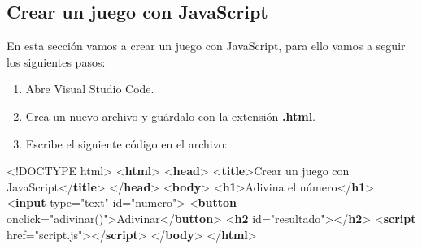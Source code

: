 \documentclass[
  a4paper,
  DIV=11,
  numbers=noendperiod,
  onepage,
  openany]{scrreprt}
\newenvironment{Shaded}{\begin{snugshade}}{\end{snugshade}}
\newcommand{\DataTypeTok}[1]{\textcolor[rgb]{0.68,0.00,0.00}{#1}}
\newcommand{\KeywordTok}[1]{\textcolor[rgb]{0.00,0.23,0.31}{\textbf{#1}}}
\newcommand{\NormalTok}[1]{\textcolor[rgb]{0.00,0.23,0.31}{#1}}
\newcommand{\OperatorTok}[1]{\textcolor[rgb]{0.37,0.37,0.37}{#1}}
\newcommand{\OtherTok}[1]{\textcolor[rgb]{0.00,0.23,0.31}{#1}}
\newcommand{\StringTok}[1]{\textcolor[rgb]{0.13,0.47,0.30}{#1}}
\begin{document}
\begin{tcolorbox}
\section{Crear un juego con
JavaScript}\label{crear-un-juego-con-javascript}

En esta sección vamos a crear un juego con JavaScript, para ello vamos a
seguir los siguientes pasos:

\begin{enumerate}
\def\labelenumi{\arabic{enumi}.}
\item
  Abre Visual Studio Code.
\item
  Crea un nuevo archivo y guárdalo con la extensión \textbf{.html}.
\item
  Escribe el siguiente código en el archivo:
\end{enumerate}

\begin{Shaded}
\begin{Highlighting}[]
\DataTypeTok{\textless{}!DOCTYPE}\NormalTok{ html}\DataTypeTok{\textgreater{}}
\DataTypeTok{\textless{}}\KeywordTok{html}\DataTypeTok{\textgreater{}}
\DataTypeTok{\textless{}}\KeywordTok{head}\DataTypeTok{\textgreater{}}
    \DataTypeTok{\textless{}}\KeywordTok{title}\DataTypeTok{\textgreater{}}\NormalTok{Crear un juego con JavaScript}\DataTypeTok{\textless{}/}\KeywordTok{title}\DataTypeTok{\textgreater{}}
\DataTypeTok{\textless{}/}\KeywordTok{head}\DataTypeTok{\textgreater{}}
\DataTypeTok{\textless{}}\KeywordTok{body}\DataTypeTok{\textgreater{}}
    \DataTypeTok{\textless{}}\KeywordTok{h1}\DataTypeTok{\textgreater{}}\NormalTok{Adivina el número}\DataTypeTok{\textless{}/}\KeywordTok{h1}\DataTypeTok{\textgreater{}}
    \DataTypeTok{\textless{}}\KeywordTok{input}\OtherTok{ type}\OperatorTok{=}\StringTok{"text"}\OtherTok{ id}\OperatorTok{=}\StringTok{"numero"}\DataTypeTok{\textgreater{}}
    \DataTypeTok{\textless{}}\KeywordTok{button}\OtherTok{ onclick}\OperatorTok{=}\StringTok{"adivinar()"}\DataTypeTok{\textgreater{}}\NormalTok{Adivinar}\DataTypeTok{\textless{}/}\KeywordTok{button}\DataTypeTok{\textgreater{}}
    \DataTypeTok{\textless{}}\KeywordTok{h2}\OtherTok{ id}\OperatorTok{=}\StringTok{"resultado"}\DataTypeTok{\textgreater{}\textless{}/}\KeywordTok{h2}\DataTypeTok{\textgreater{}}
    \DataTypeTok{\textless{}}\KeywordTok{script}\OtherTok{ href}\OperatorTok{=}\StringTok{"script.js"}\DataTypeTok{\textgreater{}\textless{}/}\KeywordTok{script}\DataTypeTok{\textgreater{}}
\DataTypeTok{\textless{}/}\KeywordTok{body}\DataTypeTok{\textgreater{}}
\DataTypeTok{\textless{}/}\KeywordTok{html}\DataTypeTok{\textgreater{}}
\end{Highlighting}
\end{Shaded}


\end{tcolorbox}
\end{document}
